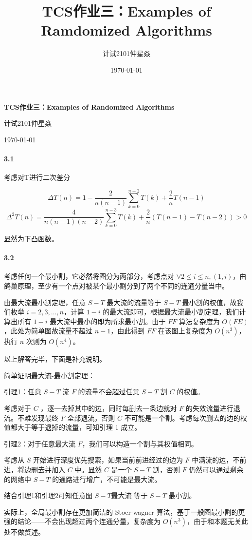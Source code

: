 \documentclass[12pt, a4paper, oneside]{ctexart}
\title{\textbf{TCS作业三：Examples of Ramdomized Algorithms}}
\author{计试2101仲星焱}
\date{\today}
\begin{document}
	\textbf{TCS作业三：Examples of Randomized Algorithms}
	
	计试2101仲星焱
	
	\today
	
	\paragraph{3.1} 考虑对T进行二次差分
	
	$$\Delta T(n) = 1 - \frac{2}{n(n-1)}\sum_{k=0}^{n-2} T(k)+ \frac{2} n T(n-1)$$
	$$\Delta^2T(n) = \frac{4}{n(n-1)(n-2)}\sum_{k=0}^{n-3}T(k)+\frac{2}n(T(n-1)-T(n-2)) > 0$$
	
	显然为下凸函数。
	
	\paragraph{3.2}
	考虑任何一个最小割，它必然将图分为两部分，考虑点对 $\forall 2\leq i\leq n,(1,i)$，由鸽巢原理，至少有一个点对被某个最小割分到了两个不同的连通分量当中。
	
	由最大流最小割定理，任意 $S-T$ 最大流的流量等于 $S-T$ 最小割的权值，故我们枚举 $i=2,3,\dots,n$，计算 $1-i$ 的最大流即可，根据最大流最小割定理，我们计算出所有 $1-i$ 最大流中最小的即为所求最小割。由于 $FF$ 算法复杂度为 $O(FE)$，此处为简单图故流量不超过 $n-1$，由此得到 $FF$ 在该图上复杂度为 $O(n^3)$，执行 $n$ 次则为 $O(n^4)$。
	
	以上解答完毕，下面是补充说明。
	
	简单证明最大流-最小割定理：
	
	引理1：{\kaishu 任意 $S-T$ 流 $F$ 的流量不会超过任意 $S-T$ 割 $C$ 的权值。}
	
	考虑对于 $C$ ，逐一去掉其中的边，同时每删去一条边就对 $F$ 的失效流量进行退流。不难发现最终 $F$ 全部退流，否则 $C$ 不可能是一个割。考虑每次删去的边的权值都大于等于退掉的流量，可知引理 $1$ 成立。
	
	引理2：{\kaishu 对于任意最大流 $F$，我们可以构造一个割与其权值相同。}
	
	考虑从 $S$ 开始进行深度优先搜索，如果当前前进经过的边为 $F$ 中满流的边，不前进，将边删去并加入 $C$ 中。显然 $C$ 是一个 $S-T$ 割，否则 $F$ 仍然可以通过剩余的网络中 $S-T$ 的通路进行增广，不可能是最大流。
	
	结合引理1和引理2可知任意图 $S-T$最大流 等于 $S-T$ 最小割。
	
	实际上，全局最小割存在更加简洁的 Stoer-wagner 算法，基于一般图最小割的更强的结论——不会出现超过两个连通分量，复杂度为 $O(n^3)$，由于和本题无关此处不做赘述。
	
\end{document}
